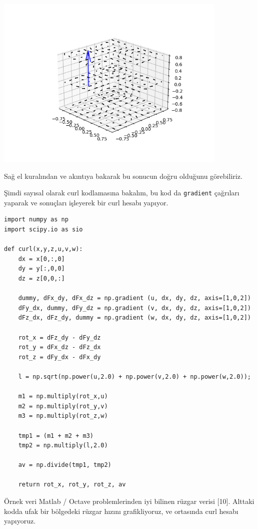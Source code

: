 \documentclass[12pt,fleqn]{article}\usepackage{../../common}
\begin{document}
\includegraphics[width=30em]{calc_multi_70_div_curl_lap_11.png}

Sağ el kuralından ve akıntıya bakarak bu sonucun doğru olduğunu görebiliriz.

Şimdi sayısal olarak curl kodlamasına bakalım, bu kod da \verb!gradient!
çağrıları yaparak ve sonuçları işleyerek bir curl hesabı yapıyor. 

\begin{verbatim}
import numpy as np
import scipy.io as sio

def curl(x,y,z,u,v,w):
    dx = x[0,:,0]
    dy = y[:,0,0]
    dz = z[0,0,:]

    dummy, dFx_dy, dFx_dz = np.gradient (u, dx, dy, dz, axis=[1,0,2])
    dFy_dx, dummy, dFy_dz = np.gradient (v, dx, dy, dz, axis=[1,0,2])
    dFz_dx, dFz_dy, dummy = np.gradient (w, dx, dy, dz, axis=[1,0,2])

    rot_x = dFz_dy - dFy_dz
    rot_y = dFx_dz - dFz_dx
    rot_z = dFy_dx - dFx_dy

    l = np.sqrt(np.power(u,2.0) + np.power(v,2.0) + np.power(w,2.0));

    m1 = np.multiply(rot_x,u)
    m2 = np.multiply(rot_y,v)
    m3 = np.multiply(rot_z,w)

    tmp1 = (m1 + m2 + m3)
    tmp2 = np.multiply(l,2.0)

    av = np.divide(tmp1, tmp2)

    return rot_x, rot_y, rot_z, av
\end{verbatim}

Örnek veri Matlab / Octave problemlerinden iyi bilinen rüzgar verisi
[10]. Alttaki kodda ufak bir bölgedeki rüzgar hızını grafikliyoruz, ve ortasında
curl hesabı yapıyoruz.
\end{document}
